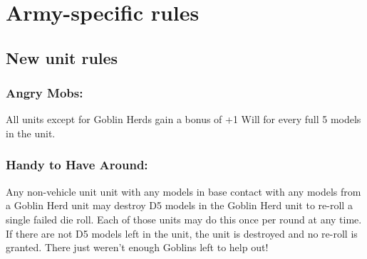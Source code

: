 \newcommand{\Flamethrower}{Flamethrower: R8 A3 Autohit D2 [Assault, Slow, Spray, Terrifying 0]}
\newcommand{\MachineGun}[1][8+]{Machine Gun: R20 A2 {#1} D2 [Assault, Suppressive 0]}
\newcommand{\RocketLauncher}[1][7+]{Rocket Launcher: R20 A1 {#1} D3 [Deadly D10-2 (min 1), slow]}
\newcommand{\TechnoBlaster}[1][7+]{Techno Blaster: R20 A1 {#1} D5 [Deadly D10, Slow, Unstable]}

\newcommand{\FieldGun}[1][6+]{Field Gun: Choose a type each time it fires:
\begin{itemize}
    \item Frag shell: R30 A4 6+ D1 [Area Effect, Heavy, Slow]
    \item Tank shell: R30 A1, 6+ D6 [Deadly D10, Heavy, Slow]
\end{itemize}
}
\newcommand{\GiantFlamethrower}{Giant Flamethrower: R10 A10 Autohit D2 [Assault, Slow, Spray, Terrifying 2]}
\newcommand{\HeavyFlamethrower}{Heavy Flamethrower: R8 A6 Autohit D2 [Assault, Slow, Spray, Terrifying 2]}
\newcommand{\Howitzer}[1][6+]{Howitzer: R30 A6 {#1} D1 [Area Effect, Heavy, Slow, Suppressive 0]}
\newcommand{\MegaCannon}[1][6+]{Mega Cannon: R30 A8 {#1} D3 [Area Effect, Deadly 3, Heavy, Slow]}
\newcommand{\RocketLaunchers}[1][7+]{Rocket Launchers: R20 A2 {#1} D3 [Deadly D10-2 (min 1), slow]}
\newcommand{\TechnoCannon}[1][6+]{Techno Cannon: R30 A3 {#1} D5 [Area Effect, Critical 10, Deadly D10+2, Heavy, Slow, Unstable 2]}
\newcommand{\TonsOfGuns}[1][8+]{Tons of Guns: R20 A6 {#1} D2 [Assault, Suppressive 0]}






\section*{Army-specific rules}

\subsection*{New unit rules}

\subsubsection*{Angry Mobs:} All units except for Goblin Herds gain a bonus of +1 Will for every full 5 models in the unit.

\subsubsection*{Handy to Have Around:} Any non-vehicle unit unit with any models in base contact with any models from a Goblin Herd unit may destroy D5 models in the Goblin Herd unit to re-roll a single failed die roll. Each of those units may do this once per round at any time. If there are not D5 models left in the unit, the unit is destroyed and no re-roll is granted. There just weren't enough Goblins left to help out!

